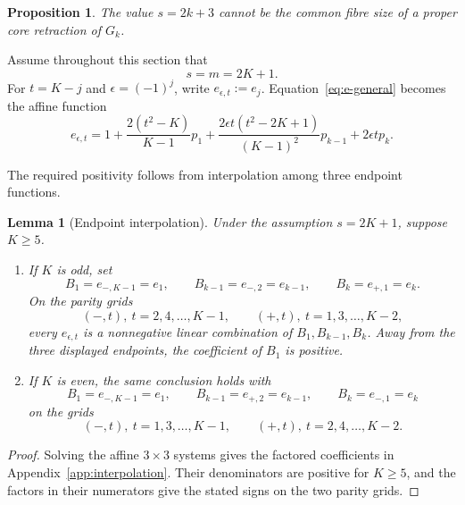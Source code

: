 \documentclass[11pt]{article}
\theoremstyle{plain}
\newtheorem{lemma}[theorem]{Lemma}
\newtheorem{proposition}[theorem]{Proposition}
\theoremstyle{remark}
\begin{document}
\begin{proposition}\label{prop:full-impossible}
The value $s=2k+3$ cannot be the common fibre size of a proper core
retraction of $G_k$.
\end{proposition}

Assume throughout this section that
\begin{equation}\label{eq:full-s}
 s=m=2K+1.
\end{equation}
For $t=K-j$ and $\epsilon=(-1)^j$, write
$e_{\epsilon,t}:=e_j$.  Equation~\eqref{eq:e-general} becomes the affine
function
\begin{equation}\label{eq:full-bracket}
 e_{\epsilon,t}=1+\frac{2(t^2-K)}{K-1}p_1
 +\frac{2\epsilon t(t^2-2K+1)}{(K-1)^2}p_{k-1}
 +2\epsilon tp_k.
\end{equation}
\begin{samepage}
The required positivity follows from interpolation among three endpoint
functions.
\begin{lemma}[Endpoint interpolation]\label{lem:endpoint-interpolation}
Under the assumption $s=2K+1$, suppose $K\ge5$.
\begin{enumerate}
 \item If $K$ is odd, set
 \[
  B_1=e_{-,K-1}=e_1,\qquad
  B_{k-1}=e_{-,2}=e_{k-1},\qquad
  B_k=e_{+,1}=e_k.
 \]
 On the parity grids
 \[
  (-,t),\ t=2,4,\ldots,K-1,\qquad
  (+,t),\ t=1,3,\ldots,K-2,
 \]
 every $e_{\epsilon,t}$ is a nonnegative linear combination of
 $B_1,B_{k-1},B_k$.  Away from the three displayed endpoints, the
 coefficient of $B_1$ is positive.

 \item If $K$ is even, the same conclusion holds with
 \[
  B_1=e_{-,K-1}=e_1,\qquad
  B_{k-1}=e_{+,2}=e_{k-1},\qquad
  B_k=e_{-,1}=e_k
 \]
 on the grids
 \[
  (-,t),\ t=1,3,\ldots,K-1,\qquad
  (+,t),\ t=2,4,\ldots,K-2.
 \]
\end{enumerate}
\end{lemma}
\end{samepage}

\begin{proof}
Solving the affine $3\times3$ systems gives the factored coefficients in
Appendix~\ref{app:interpolation}.  Their denominators are positive for
$K\ge5$, and the factors in their numerators give the stated signs on the
two parity grids.
\end{proof}
\end{document}
